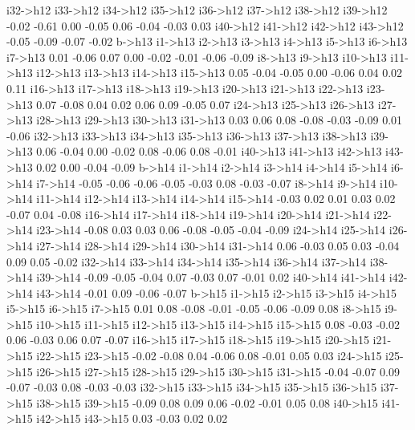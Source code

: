 \documentclass{article}
\begin{document}
\begin{Schunk}
\begin{Soutput}
i32->h12 i33->h12 i34->h12 i35->h12 i36->h12 i37->h12 i38->h12 i39->h12 
   -0.02    -0.61     0.00    -0.05     0.06    -0.04    -0.03     0.03 
i40->h12 i41->h12 i42->h12 i43->h12 
   -0.05    -0.09    -0.07    -0.02 
  b->h13  i1->h13  i2->h13  i3->h13  i4->h13  i5->h13  i6->h13  i7->h13 
    0.01    -0.06     0.07     0.00    -0.02    -0.01    -0.06    -0.09 
 i8->h13  i9->h13 i10->h13 i11->h13 i12->h13 i13->h13 i14->h13 i15->h13 
    0.05    -0.04    -0.05     0.00    -0.06     0.04     0.02     0.11 
i16->h13 i17->h13 i18->h13 i19->h13 i20->h13 i21->h13 i22->h13 i23->h13 
    0.07    -0.08     0.04     0.02     0.06     0.09    -0.05     0.07 
i24->h13 i25->h13 i26->h13 i27->h13 i28->h13 i29->h13 i30->h13 i31->h13 
    0.03     0.06     0.08    -0.08    -0.03    -0.09     0.01    -0.06 
i32->h13 i33->h13 i34->h13 i35->h13 i36->h13 i37->h13 i38->h13 i39->h13 
    0.06    -0.04     0.00    -0.02     0.08    -0.06     0.08    -0.01 
i40->h13 i41->h13 i42->h13 i43->h13 
    0.02     0.00    -0.04    -0.09 
  b->h14  i1->h14  i2->h14  i3->h14  i4->h14  i5->h14  i6->h14  i7->h14 
   -0.05    -0.06    -0.06    -0.05    -0.03     0.08    -0.03    -0.07 
 i8->h14  i9->h14 i10->h14 i11->h14 i12->h14 i13->h14 i14->h14 i15->h14 
   -0.03     0.02     0.01     0.03     0.02    -0.07     0.04    -0.08 
i16->h14 i17->h14 i18->h14 i19->h14 i20->h14 i21->h14 i22->h14 i23->h14 
   -0.08     0.03     0.03     0.06    -0.08    -0.05    -0.04    -0.09 
i24->h14 i25->h14 i26->h14 i27->h14 i28->h14 i29->h14 i30->h14 i31->h14 
    0.06    -0.03     0.05     0.03    -0.04     0.09     0.05    -0.02 
i32->h14 i33->h14 i34->h14 i35->h14 i36->h14 i37->h14 i38->h14 i39->h14 
   -0.09    -0.05    -0.04     0.07    -0.03     0.07    -0.01     0.02 
i40->h14 i41->h14 i42->h14 i43->h14 
   -0.01     0.09    -0.06    -0.07 
  b->h15  i1->h15  i2->h15  i3->h15  i4->h15  i5->h15  i6->h15  i7->h15 
    0.01     0.08    -0.08    -0.01    -0.05    -0.06    -0.09     0.08 
 i8->h15  i9->h15 i10->h15 i11->h15 i12->h15 i13->h15 i14->h15 i15->h15 
    0.08    -0.03    -0.02     0.06    -0.03     0.06     0.07    -0.07 
i16->h15 i17->h15 i18->h15 i19->h15 i20->h15 i21->h15 i22->h15 i23->h15 
   -0.02    -0.08     0.04    -0.06     0.08    -0.01     0.05     0.03 
i24->h15 i25->h15 i26->h15 i27->h15 i28->h15 i29->h15 i30->h15 i31->h15 
   -0.04    -0.07     0.09    -0.07    -0.03     0.08    -0.03    -0.03 
i32->h15 i33->h15 i34->h15 i35->h15 i36->h15 i37->h15 i38->h15 i39->h15 
   -0.09     0.08     0.09     0.06    -0.02    -0.01     0.05     0.08 
i40->h15 i41->h15 i42->h15 i43->h15 
    0.03    -0.03     0.02     0.02 

\end{Soutput}
\end{Schunk}
\end{document}
